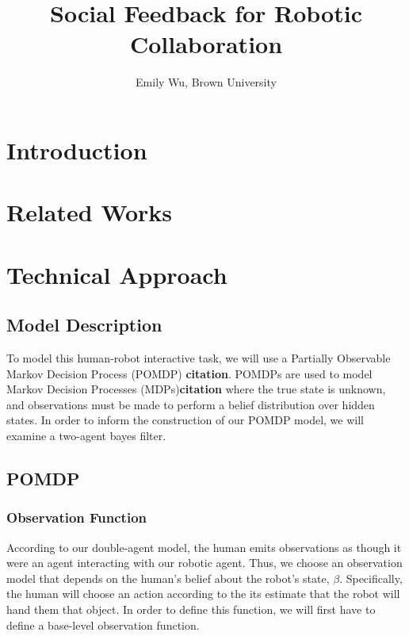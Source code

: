 \documentclass{article}
\title{Social Feedback for Robotic Collaboration}
\author{Emily Wu, Brown University}
\begin{document}
\maketitle

\tableofcontents

\section{Introduction}

\section{Related Works}

\section{Technical Approach}

\subsection{Model Description}

To model this human-robot interactive task, we will use a Partially Observable Markov Decision Process (POMDP) \textbf{citation}. POMDPs are used to model Markov Decision Processes (MDPs)\textbf{citation} where the true state is unknown, and observations must be made to perform a belief distribution over hidden states. In order to inform the construction of our POMDP model, we will examine a two-agent bayes filter. 



\subsection{POMDP}

\subsubsection{Observation Function}

According to our double-agent model, the human emits observations as though it were an agent interacting with our robotic agent. Thus, we choose an observation model that depends on the human's belief about the robot's state, $\beta$. Specifically, the human will choose an action according to the its estimate that the robot will hand them that object. In order to define this function, we will first have to define a base-level observation function. 
\end{document}
